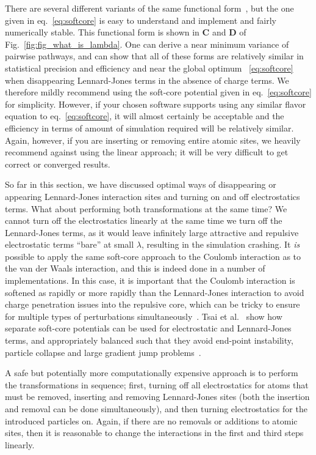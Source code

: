 \documentclass[9pt,bestpractices]{livecoms}
\begin{document}
There are several different variants of the same functional form~\cite{zacharias1994separationshifted, beutler1994avoiding,pham2011identifying,Lee_JChemTheoryComput_2020_v16_p5512,tsai2023amber}, but the one given in eq.~\ref{eq:softcore} is easy to understand and implement and fairly numerically stable. This functional form is shown in \textbf{C} and \textbf{D} of Fig.~\ref{fig:fig_what_is_lambda}.  One can derive a near minimum variance of pairwise pathways, and can show that all of these forms are relatively similar in statistical precision and efficiency and near the global optimum ~\ref{eq:softcore}~\cite{pham2012optimal} when disappearing Lennard-Jones terms in the absence of charge terms. We therefore mildly recommend using the soft-core potential given in eq.~\ref{eq:softcore} for simplicity. However, if your chosen software supports using any similar flavor equation to eq.~\ref{eq:softcore}, it will almost certainly be acceptable and the efficiency in terms of amount of simulation required will be relatively similar.  Again, however, if you are inserting or removing entire atomic sites, we heavily recommend against using the linear approach; it will be very difficult to get correct or converged results. 

So far in this section, we have discussed optimal ways of disappearing or appearing Lennard-Jones interaction sites and turning on and off electrostatics terms. What about performing both transformations at the same time? We cannot turn off the electrostatics linearly at the same time we turn off the Lennard-Jones terms, as it would leave infinitely large attractive and repulsive electrostatic terms ``bare'' at small $\lambda$, resulting in the simulation crashing. It \textit{is} possible to apply the same soft-core approach to the Coulomb interaction as to the van der Waals interaction, and this is indeed done in a number of implementations. In this case, it is important that the Coulomb interaction is softened as rapidly or more rapidly than the Lennard-Jones interaction to avoid charge penetration issues into the repulsive core, which  can be tricky to ensure for multiple types of perturbations simultaneously~\cite{steinbrecher2011softcore}. Tsai et al.~\cite{tsai2023amber} show how separate soft-core potentials can be used for electrostatic and Lennard-Jones terms, and appropriately balanced such that they avoid end-point instability, particle collapse and large gradient jump problems~\cite{tsai2023amber}.

A safe but potentially more computationally expensive approach is to perform the transformations in sequence; first, turning off all electrostatics for atoms that must be removed, inserting and removing Lennard-Jones sites (both the insertion and removal can be done simultaneously), and then turning electrostatics for the introduced particles on. Again, if there are no removals or additions to atomic sites, then it is reasonable to change the interactions in the first and third steps  linearly. 
\end{document}
